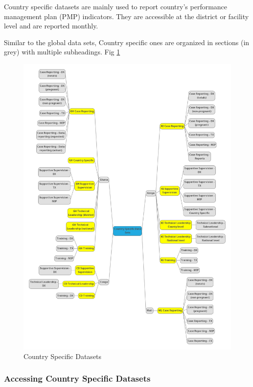 \documentclass[]{book}
\begin{document}
Country specific datasets are mainly used to report country's performance management plan (PMP) indicators. They are accessible at the district or facility level and are reported monthly.

Similar to the global data sets, Country specific ones are organized in sections (in grey) with multiple subheadings. Fig \ref{fig:pmp-datasets}

\begin{figure}
\includegraphics[width=18.6in]{./images/pmp datasets} \caption{Country Specific Datasets}\label{fig:pmp-datasets}
\end{figure}

\hypertarget{accessing-country-specific-datasets}{%
\subsubsection{Accessing Country Specific Datasets}\label{accessing-country-specific-datasets}}
\end{document}
